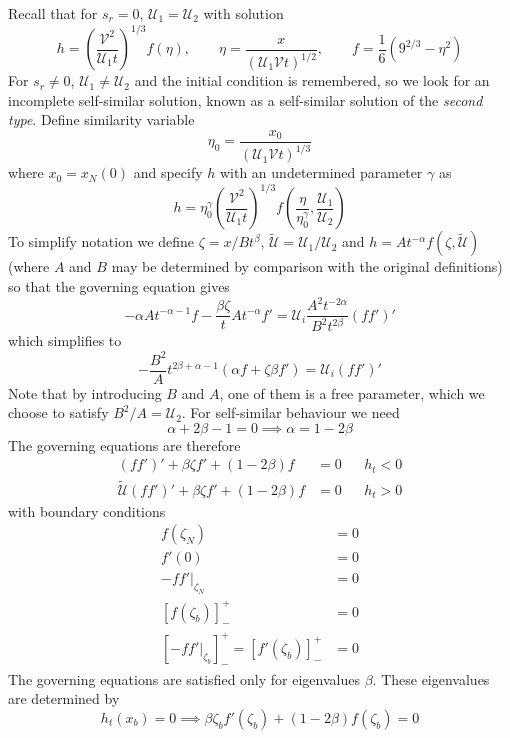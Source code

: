 \documentclass{jknotes}
\newcommand{\dif}[1]{\left[#1\right]^+_-}
\begin{document}
Recall that for $s_r = 0$, $\mathcal{U}_1 = \mathcal{U}_2$ with solution
\begin{equation}
	h = \left( \frac{\mathcal{V}^2}{\mathcal{U}_1 t}\right)^{1/3} f(\eta),
	\hspace{2em} \eta = \frac{x}{(\mathcal{U}_1\mathcal{V}t)^{1/2}},
	\hspace{2em} f = \frac{1}{6}\left( 9^{2/3} - \eta^2\right)
\end{equation}
For $s_r \ne 0$, $\mathcal{U}_1 \ne \mathcal{U}_2$ and the initial condition
is remembered, so we look for an incomplete self-similar solution, known as a
self-similar solution of the \emph{second type}. Define similarity variable
\begin{equation}
	\eta_0 = \frac{x_0}{(\mathcal{U}_1\mathcal{V}t)^{1/3}}
\end{equation}
where $x_0 = x_N(0)$ and specify $h$ with an undetermined parameter $\gamma$ as
\begin{equation}
	h = \eta_0^\gamma \left( \frac{\mathcal{V}^2}{\mathcal{U}_1t}\right)^{1/3}
	f\left(\frac{\eta}{\eta_0^\gamma},\frac{\mathcal{U}_1}{\mathcal{U}_2}\right)
\end{equation}
To simplify notation we define $\zeta = x/Bt^\beta$, $\tilde{\mathcal{U}} =
\mathcal{U}_1/\mathcal{U}_2$ and $h = A t^{-\alpha} f(\zeta,
\tilde{\mathcal{U}})$ (where $A$ and $B$ may be determined by comparison with
the original definitions) so that the governing equation gives
\begin{equation}
	-\alpha A t^{-\alpha-1} f - \frac{\beta \zeta}{t}At^{-\alpha} f' =
	\mathcal{U}_i \frac{A^2 t^{-2\alpha}}{B^2 t^{2\beta}} (ff')'
\end{equation}
which simplifies to
\begin{equation}
	-\frac{B^2}{A} t^{2\beta + \alpha -1} (\alpha f + \zeta \beta f') =
	\mathcal{U}_i(ff')'
\end{equation}
Note that by introducing $B$ and $A$, one of them is a free parameter, which
we choose to satisfy $B^2/A = \mathcal{U}_2$. For self-similar behaviour we
need
\begin{equation}
	\alpha + 2\beta -1 = 0 \implies \alpha = 1 - 2\beta
\end{equation}
The governing equations are therefore
\begin{align}
	(ff')' + \beta \zeta f' + (1-2\beta) f &= 0 && h_t < 0 \\
	\tilde{\mathcal{U}}(ff')' + \beta \zeta f' + (1-2\beta) f &= 0 && h_t > 0
\end{align}
with boundary conditions
\begin{align}
	f(\zeta_N) &= 0 \\
	f'(0) &= 0 \\
	-\left.ff'\right|_{\zeta_N} &= 0 \\
	\dif{f(\zeta_b)} &= 0 \\
	\dif{-\left.ff'\right|_{\zeta_b}} = \dif{f'(\zeta_b)} &= 0 
\end{align}
The governing equations are satisfied only for eigenvalues $\beta$. These
eigenvalues are determined by
\begin{equation}
	h_t(x_b) = 0 \implies \beta \zeta_b f'(\zeta_b) + (1-2\beta) f(\zeta_b) =
	0
\end{equation}
\end{document}
